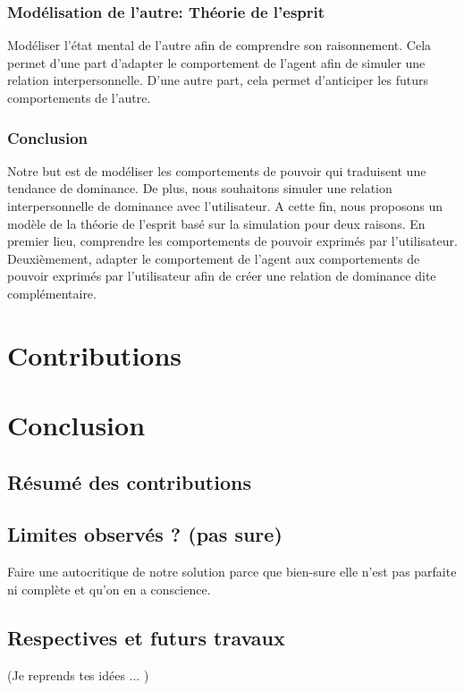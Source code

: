 \documentclass [french]{article}
\begin{document}
			\subsubsection{Modélisation de l'autre: Théorie de l'esprit} Modéliser l'état mental de l'autre afin de comprendre son raisonnement. Cela permet d'une part d'adapter le comportement de l'agent afin de simuler une relation interpersonnelle. D'une autre part, cela permet d'anticiper les futurs comportements de l'autre. 
		
		\subsubsection{Conclusion}
		
			Notre but est de modéliser les comportements de pouvoir qui traduisent une tendance de dominance. De plus, nous souhaitons simuler une relation interpersonnelle de dominance avec l'utilisateur. A cette fin, nous proposons un modèle de la théorie de l'esprit basé sur la simulation  pour deux raisons. En premier lieu, comprendre les comportements de pouvoir exprimés par l'utilisateur. Deuxièmement, adapter le comportement de l'agent aux comportements de pouvoir exprimés par l'utilisateur afin de créer une relation de dominance dite complémentaire. 	
			
	
	\section{Contributions}
	 
		
	
	
	\section{Conclusion}
		\subsection{Résumé des contributions}
		
		\subsection{Limites observés ? (pas sure)}
			Faire une autocritique de notre solution parce que bien-sure elle n'est pas parfaite ni complète et qu'on en a conscience. 
		
		\subsection{Respectives et futurs travaux}
			(Je reprends tes idées ... )
\end{document}

